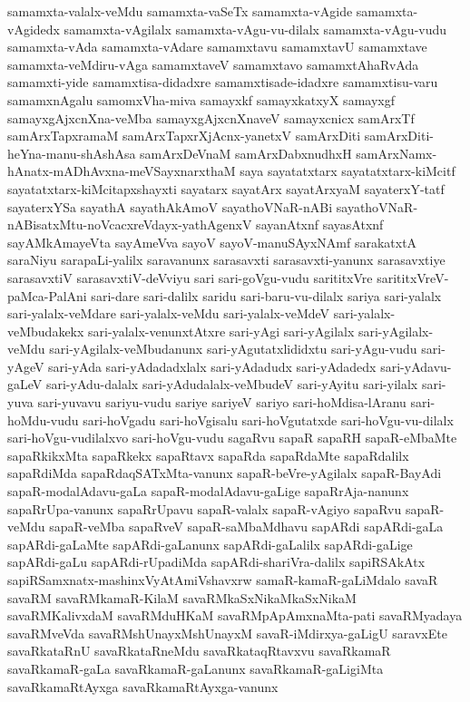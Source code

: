 {samamxta-valalx-veMdu
samamxta-vaSeTx
samamxta-vAgide
samamxta-vAgidedx
samamxta-vAgilalx
samamxta-vAgu-vu-dilalx
samamxta-vAgu-vudu
samamxta-vAda
samamxta-vAdare
samamxtavu
samamxtavU
samamxtave
samamxta-veMdiru-vAga
samamxtaveV
samamxtavo
samamxtAhaRvAda
samamxti-yide
samamxtisa-didadxre
samamxtisade-idadxre
samamxtisu-varu
samamxnAgalu
samomxVha-miva
samayxkf
samayxkatxyX
samayxgf
samayxgAjxcnXna-veMba
samayxgAjxcnXnaveV
samayxcnicx
samArxTf
samArxTapxramaM
samArxTapxrXjAcnx-yanetxV
samArxDiti
samArxDiti-heYna-manu-shAshAsa
samArxDeVnaM
samArxDabxnudhxH
samArxNamx-hAnatx-mADhAvxna-meVSayxnarxthaM
saya
sayatatxtarx
sayatatxtarx-kiMcitf
sayatatxtarx-kiMcitapxshayxti
sayatarx
sayatArx
sayatArxyaM
sayaterxY-tatf
sayaterxYSa
sayathA
sayathAkAmoV
sayathoVNaR-nABi
sayathoVNaR-nABisatxMtu-noVcacxreVdayx-yathAgenxV
sayanAtxnf
sayasAtxnf
sayAMkAmayeVta
sayAmeVva
sayoV
sayoV-manuSAyxNAmf
sarakatxtA
saraNiyu
sarapaLi-yalilx
saravanunx
sarasavxti
sarasavxti-yanunx
sarasavxtiye
sarasavxtiV
sarasavxtiV-deVviyu
sari
sari-goVgu-vudu
sarititxVre
sarititxVreV-paMca-PalAni
sari-dare
sari-dalilx
saridu
sari-baru-vu-dilalx
sariya
sari-yalalx
sari-yalalx-veMdare
sari-yalalx-veMdu
sari-yalalx-veMdeV
sari-yalalx-veMbudakekx
sari-yalalx-venunxtAtxre
sari-yAgi
sari-yAgilalx
sari-yAgilalx-veMdu
sari-yAgilalx-veMbudanunx
sari-yAgutatxlididxtu
sari-yAgu-vudu
sari-yAgeV
sari-yAda
sari-yAdadadxlalx
sari-yAdadudx
sari-yAdadedx
sari-yAdavu-gaLeV
sari-yAdu-dalalx
sari-yAdudalalx-veMbudeV
sari-yAyitu
sari-yilalx
sari-yuva
sari-yuvavu
sariyu-vudu
sariye
sariyeV
sariyo
sari-hoMdisa-lAranu
sari-hoMdu-vudu
sari-hoVgadu
sari-hoVgisalu
sari-hoVgutatxde
sari-hoVgu-vu-dilalx
sari-hoVgu-vudilalxvo
sari-hoVgu-vudu
sagaRvu
sapaR
sapaRH
sapaR-eMbaMte
sapaRkikxMta
sapaRkekx
sapaRtavx
sapaRda
sapaRdaMte
sapaRdalilx
sapaRdiMda
sapaRdaqSATxMta-vanunx
sapaR-beVre-yAgilalx
sapaR-BayAdi
sapaR-modalAdavu-gaLa
sapaR-modalAdavu-gaLige
sapaRrAja-nanunx
sapaRrUpa-vanunx
sapaRrUpavu
sapaR-valalx
sapaR-vAgiyo
sapaRvu
sapaR-veMdu
sapaR-veMba
sapaRveV
sapaR-saMbaMdhavu
sapARdi
sapARdi-gaLa
sapARdi-gaLaMte
sapARdi-gaLanunx
sapARdi-gaLalilx
sapARdi-gaLige
sapARdi-gaLu
sapARdi-rUpadiMda
sapARdi-shariVra-dalilx
sapiRSAkAtx
sapiRSamxnatx-mashinxVyAtAmiVshavxrw
samaR-kamaR-gaLiMdalo
savaR
savaRM
savaRMkamaR-KilaM
savaRMkaSxNikaMkaSxNikaM
savaRMKalivxdaM
savaRMduHKaM
savaRMpApAmxnaMta-pati
savaRMyadaya
savaRMveVda
savaRMshUnayxMshUnayxM
savaR-iMdirxya-gaLigU
saravxEte
savaRkataRnU
savaRkataRneMdu
savaRkataqRtavxvu
savaRkamaR
savaRkamaR-gaLa
savaRkamaR-gaLanunx
savaRkamaR-gaLigiMta
savaRkamaRtAyxga
savaRkamaRtAyxga-vanunx
}
